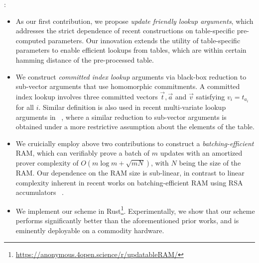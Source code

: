 \documentclass[sigconf]{acmart}
\begin{document}
:
\begin{itemize}[leftmargin=2em]
\item As our first contribution, we propose {\em update friendly lookup arguments}, which addresses
the strict dependence of recent constructions on table-specific pre-computed parameters. Our
innovation extends the utility of table-specific parameters to enable efficient lookups from tables,
which are within certain hamming distance of the pre-processed table.
\item We construct {\em committed index lookup} arguments via black-box reduction to
sub-vector arguments that use homomorphic commitments. A committed index lookup involves
three committed vectors $\vec{t},\vec{a}$ and $\vec{v}$ satisfying $v_i=t_{a_i}$ for all $i$. Similar
definition is also used in recent multi-variate lookup arguments in ~\cite{lasso}, where a similar reduction
to sub-vector arguments is obtained under a more restrictive assumption about the elements of the table.
\item We cruicially employ above two contributions to construct a {\em batching-efficient} RAM, which
can verifiably prove a batch of $m$ updates with an amortized prover complexity of $O(m\log m + \sqrt{mN})$,
with $N$ being the size of the RAM. Our dependence on the RAM size is sub-linear, in contrast to linear complexity
inherent in recent works on batching-efficient RAM using RSA accumulators ~\cite{}.
\item We implement our scheme in Rust\footnote{\url{https://anonymous.4open.science/r/updatableRAM/}}.
Experimentally, we show that our scheme performs significantly better than the aforementioned prior works,
and is eminently deployable on a commodity hardware.
\end{itemize}
\end{document}
